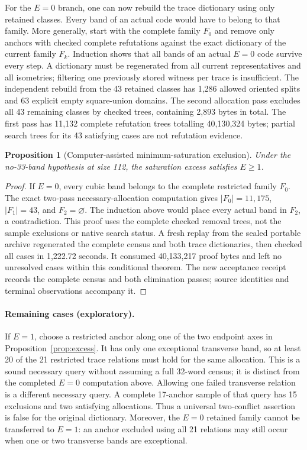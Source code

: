 \documentclass[11pt]{article}
\newtheorem{proposition}[theorem]{Proposition}
\theoremstyle{definition}
\begin{document}
For the $E=0$ branch, one can now rebuild the trace dictionary using
only retained classes. Every band of an actual code would have to
belong to that family. More generally, start with the complete family
$F_0$ and remove only anchors with checked complete refutations against
the exact dictionary of the current family $F_k$. Induction shows that
all bands of an actual $E=0$ code survive every step. A dictionary must
be regenerated from all current representatives and all isometries;
filtering one previously stored witness per trace is insufficient.
The independent rebuild from the 43 retained classes has 1,286 allowed
oriented splits and 63 explicit empty square-union domains. The second
allocation pass excludes all 43 remaining classes by checked trees,
containing 2,893 bytes in total. The first pass has 11,132 complete
refutation trees totalling 40,130,324 bytes; partial search trees for
its 43 satisfying cases are not refutation evidence.

\begin{proposition}[Computer-assisted minimum-saturation exclusion]
Under the no-33-band hypothesis at size 112, the saturation excess
satisfies $E\geq1$.
\end{proposition}
\begin{proof}
If $E=0$, every cubic band belongs to the complete restricted family
$F_0$. The exact two-pass necessary-allocation computation gives
$|F_0|=11,175$, $|F_1|=43$, and $F_2=\varnothing$.
The induction above would place every actual band in $F_2$, a
contradiction. This proof uses the complete checked removal trees,
not the sample exclusions or native search status. A fresh replay from
the sealed portable archive regenerated the complete census and both
trace dictionaries, then checked all cases in 1,222.72 seconds. It
consumed 40,133,217 proof bytes and left no unresolved cases within
this conditional theorem. The new acceptance receipt records the complete census and both
elimination passes; source identities and terminal observations accompany it.
\end{proof}

\paragraph{Remaining cases (exploratory).}
If $E=1$, choose a restricted anchor along one of the two endpoint axes
in Proposition~\ref{prop:excess}. It has only one exceptional transverse
band, so at least 20 of the 21 restricted trace relations must hold for
the same allocation. This is a sound necessary query without
assuming a full 32-word census; it is distinct from the completed
$E=0$ computation above. Allowing one failed transverse relation is a different necessary query.
A complete 17-anchor sample of that query has 15 exclusions and two
satisfying allocations. Thus a universal two-conflict assertion is
false for the original dictionary. Moreover, the $E=0$ retained family
cannot be transferred to $E=1$: an anchor excluded using all 21 relations
may still occur when one or two transverse bands are exceptional.
\end{document}
